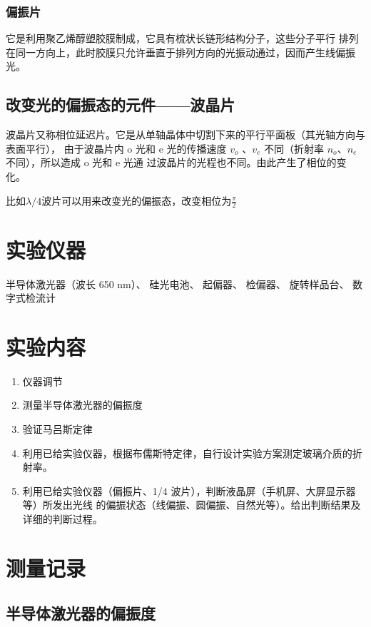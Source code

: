 \documentclass[a4paper,UTF8]{ctexart}
\begin{document}
\subsubsection{偏振片}

它是利用聚乙烯醇塑胶膜制成，它具有梳状长链形结构分子，这些分子平行
排列在同一方向上，此时胶膜只允许垂直于排列方向的光振动通过，因而产生线偏振光。

\subsection{改变光的偏振态的元件——波晶片}

波晶片又称相位延迟片。它是从单轴晶体中切割下来的平行平面板（其光轴方向与表面平行），
由于波晶片内 o 光和 e 光的传播速度 $v_o$ 、$v_e$ 不同（折射率 $n_o$、$n_e$ 不同），所以造成 o 光和 e 光通
过波晶片的光程也不同。由此产生了相位的变化。

比如$\lambda / 4$波片可以用来改变光的偏振态，改变相位为$\frac{\pi}{2}$

\section{实验仪器}
半导体激光器（波长 650 nm）、 硅光电池、 起偏器、 检偏器、 旋转样品台、 数字式检流计


\section{实验内容}

\begin{enumerate}
    \item 仪器调节
    \item 测量半导体激光器的偏振度
    \item 验证马吕斯定律
    \item 利用已给实验仪器，根据布儒斯特定律，自行设计实验方案测定玻璃介质的折射率。
    \item 利用已给实验仪器（偏振片、1/4 波片），判断液晶屏（手机屏、大屏显示器等）所发出光线
的偏振状态（线偏振、圆偏振、自然光等）。给出判断结果及详细的判断过程。
\end{enumerate}

\section{测量记录}

\subsection{半导体激光器的偏振度}
\end{document}
